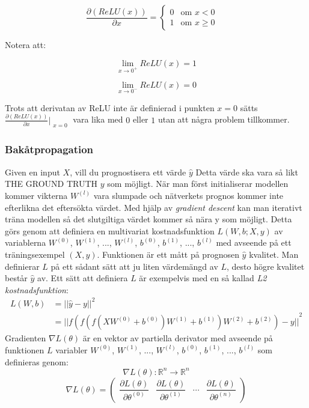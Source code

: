 \documentclass[a4paper,11pt,twoside]{article}
\newcommand*{\pd}[2]{\ensuremath{\dfrac{\partial #1}{\partial #2}}}
\newcommand*{\inpd}[2]{\ensuremath{\frac{\partial #1}{\partial #2}}}
\begin{document}
\begin{equation}
\pd{(ReLU(x))}{x} = \begin{cases} 
			0 & \mbox{om } x < 0 \\ 
			1 & \mbox{om } x \geq 0 
		\end{cases} \quad
\end{equation}

Notera att:

\begin{equation}
\lim_{x\to 0^+} ReLU(x) = 1
\end{equation}

\begin{equation}
\lim_{x\to 0^-} ReLU(x) = 0
\end{equation}

Trots att derivatan av ReLU inte är definierad i punkten $x = 0$ sätts $\inpd{(ReLU(x))}{x}|_{\substack{x=0}}$ vara lika med $0$ eller $1$ utan att några problem tillkommer.

\subsubsection{Bakåtpropagation}
Given en input $X$, vill du prognostisera ett värde $\hat{y}$ Detta värde ska vara så likt THE GROUND TRUTH $y$ som möjligt. När man först initialiserar modellen kommer vikterna $W^{(l)}$ vara slumpade och nätverkets prognos kommer inte efterlikna det eftersökta värdet. Med hjälp av \textit{gradient descent} kan man iterativt träna modellen så det slutgiltiga värdet kommer så nära y som möjligt. Detta görs genom att definiera en multivariat kostnadsfunktion $L(W, b; X,y)$ av variablerna $W^{(0)}$, $W^{(1)}$, ..., $W^{(l)}$, $b^{(0)}$, $b^{(1)}$, ..., $b^{(l)}$ med avseende på ett träningsexempel $(X, y)$. Funktionen är ett mått på prognosen $\hat{y}$ kvalitet. Man definierar $L$ på ett sådant sätt att ju liten värdemängd av $L$, desto högre kvalitet består $\hat{y}$ av. Ett sätt att definiera $L$ är exempelvis med en så kallad \textit{L2 kostnadsfunktion}:
\begin{equation}
\begin{split}
L(W,b) 	& = {||\hat{y}-y||}^2 \\
		& = {||f(f(f(XW^{(0)} +b^{(0)})W^{(1)} +b^{(1)})W^{(2)} +b^{(2)}) - y||}^2
\end{split}
\end{equation}
Gradienten $\nabla L(\theta)$ är en vektor av partiella derivator med avseende på funktionen $L$ variabler $W^{(0)}$, $W^{(1)}$, ..., $W^{(l)}$, $b^{(0)}$, $b^{(1)}$, ..., $b^{(l)}$ som definieras genom: 
\begin{equation}
\nabla L(\theta) : \mathbb{R}^n \to \mathbb{R}^n
\end{equation}
\begin{equation}
\nabla L(\theta) = 
	\begin{pmatrix} 
		\pd{L(\theta)}{\theta^{(0)}} & 
		\pd{L(\theta)}{\theta^{(1)}} &
		\cdots &
		\pd{L(\theta)}{\theta^{(n)}}
		
		\end{pmatrix}
\end{equation}
\end{document}
